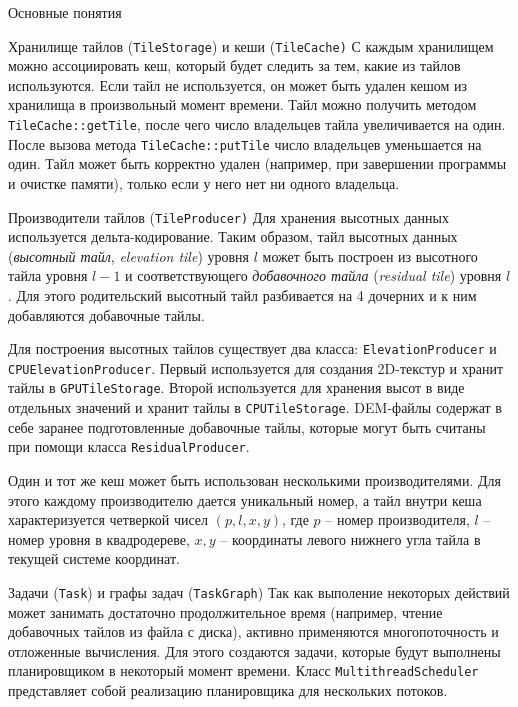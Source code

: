 \documentclass[12pt]{article}
\newcommand{\englishterm}[1]{\textenglish{\texttt{#1}}}
\begin{document}
\begin{section}{Основные понятия}
\begin{subsection}{Хранилище тайлов (\englishterm{TileStorage}) и кеши (\englishterm{TileCache)}}
С каждым хранилищем можно ассоциировать кеш, который будет следить за тем, какие из тайлов используются. Если тайл не используется, он может быть удален кешом из хранилища в произвольный момент времени.
Тайл можно получить методом \englishterm{TileCache::getTile}, после чего число владельцев тайла увеличивается на один. После вызова метода \englishterm{TileCache::putTile} число владельцев уменьшается на один.
Тайл может быть корректно удален (например, при завершении программы и очистке памяти), только если у него нет ни одного владельца.
\end{subsection}
 
\begin{subsection}{Производители тайлов (\englishterm{TileProducer)}}
Для хранения высотных данных используется дельта-кодирование. Таким образом, тайл высотных данных (\textit{высотный тайл}, \textit{elevation tile}) уровня $l$ может быть построен из высотного тайла уровня $l - 1$ и соответствующего \textit{добавочного тайла} (\textit{residual tile}) уровня $l$.
Для этого родительский высотный тайл разбивается на 4 дочерних и к ним добавляются добавочные тайлы.

Для построения высотных тайлов существует два класса: \englishterm{ElevationProducer} и \englishterm{CPUElevationProducer}. Первый используется для создания 2D-текстур и хранит тайлы в \englishterm{GPUTileStorage}. Второй используется для хранения высот в виде отдельных значений и хранит тайлы в \englishterm{CPUTileStorage}.
DEM-файлы содержат в себе заранее подготовленные добавочные тайлы, которые могут быть считаны при помощи класса \englishterm{ResidualProducer}.

Один и тот же кеш может быть использован несколькими производителями. Для этого каждому производителю дается уникальный номер, а тайл внутри кеша характеризуется четверкой чисел $(p, l, x, y)$, где $p$ -- номер производителя, $l$ -- номер уровня в квадродереве, $x, y$ -- координаты левого нижнего угла тайла в текущей системе координат.
\end{subsection}

\begin{subsection}{Задачи (\englishterm{Task}) и графы задач (\englishterm{TaskGraph})}
Так как выполение некоторых действий может занимать достаточно продолжительное время (например, чтение добавочных тайлов из файла с диска), активно применяются многопоточность и отложенные вычисления. Для этого создаются задачи, которые будут выполнены планировщиком в некоторый момент времени.
Класс \englishterm{MultithreadScheduler} представляет собой реализацию планировщика для нескольких потоков.


\end{subsection}
\end{section}
\end{document}
